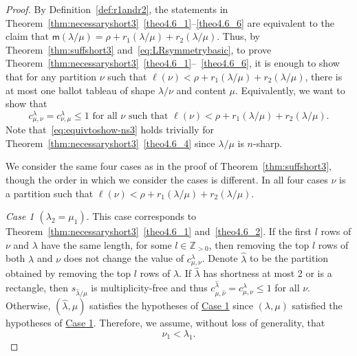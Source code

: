 \documentclass[ALCO,ThmDefs,Unicode,epreuves]{cedram}
\newcommand{\msf}{\mathsf{m}}
\let\hypertargeta\hypertarget %
\let\hyperlinka\hyperlink %
\newenvironment{Case}[1]{\par\vskip2pt\noindent%
\emph{#1}.}{\vskip2pt}
\begin{document}
\begin{proof}
By Definition~\ref{def:r1andr2}, the statements in Theorem~\ref{thm:necessaryshort3}~\ref{theo4.6_1}--\ref{theo4.6_6} are equivalent to the claim that $\msf (\lambda/\mu)=\rho + r_1(\lambda / \mu) + r_2 (\lambda / \mu)$. Thus, by Theorem~\ref{thm:suffshort3} and~\eqref{eq:LRsymmetrybasic}, to prove Theorem~\ref{thm:necessaryshort3}~\ref{theo4.6_1}--~\ref{theo4.6_6}, it is enough to show that for any partition $\nu$ such that $\ell(\nu) < \rho + r_1(\lambda / \mu) + r_2 (\lambda / \mu)$, there is at most one ballot tableau of shape $\lambda/\nu$ and content $\mu$. Equivalently, we want to show that
\begin{equation}
\label{eq:equivtoshow-ns3}
c^{\lambda}_{\mu,\nu} = c^{\lambda}_{\nu,\mu}\leq 1\text{ for all }\nu\text{ such that } \ell(\nu) < \rho + r_1(\lambda / \mu) + r_2 (\lambda / \mu).
\end{equation}
Note that~\eqref{eq:equivtoshow-ns3} holds trivially for Theorem~\ref{thm:necessaryshort3}~\ref{theo4.6_4} since $\lambda/ \mu$ is $n$-sharp.


We consider the same four cases as in the proof of Theorem~\ref{thm:suffshort3}, though the order in which we consider the cases is different. In all four cases $\nu$ is a partition such that $\ell(\nu) < \rho + r_1(\lambda / \mu) + r_2 (\lambda / \mu)$.

\begin{Case}
{\hypertargeta{theo4.6_case1}{Case 1} $(\lambda_2 = \mu_1)$} This case corresponds to Theorem~\ref{thm:necessaryshort3}~\ref{theo4.6_1} and~\ref{theo4.6_2}. If the first $l$ rows of $\nu$ and $\lambda$ have the same length, for some $l\in \mathbb{Z}_{>0}$, then removing the top $l$ rows of both $\lambda$ and $\nu$ does not change the value of $c^\lambda_{\mu,\nu}$. Denote $\widehat \lambda$ to be the partition obtained by removing the top $l$ rows of $\lambda$. If $\widehat \lambda$ has shortness at most 2 or is a rectangle, then $s_{\widehat \lambda/\mu}$ is multiplicity-free and thus $c^{\widehat \lambda}_{\mu,\widehat \nu} = c^\lambda_{\mu,\nu} \leq 1$ for all $\nu$. Otherwise, $(\widehat \lambda,\mu)$ satisfies the hypotheses of \hyperlinka{theo4.6_case1}{Case 1} since $(\lambda,\mu)$ satisfied the hypotheses of \hyperlinka{theo4.6_case1}{Case 1}.
Therefore, we assume, without loss of generality, that 
\begin{equation}
\label{eq:nu1<la1}
 \nu_1<\lambda_1.
\end{equation}


\end{Case}
\end{proof}
\end{document}
